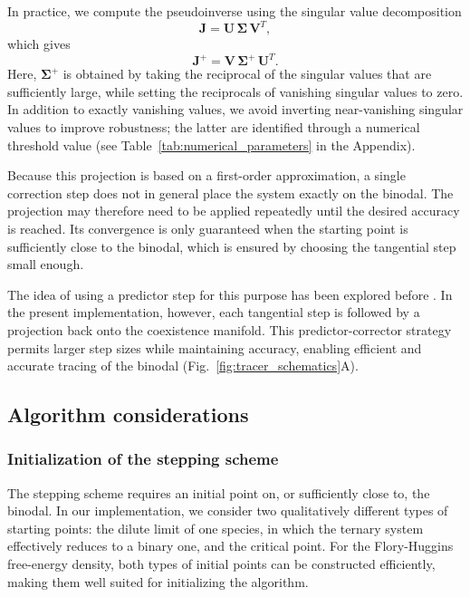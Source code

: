 \documentclass[12pt]{article}
\begin{document}
In practice, we compute the pseudoinverse using the singular value decomposition
\[
\boldsymbol{J} = \boldsymbol{U}\,\boldsymbol{\Sigma}\,\boldsymbol{V}^T,
\]
which gives
\[
\boldsymbol{J}^+ = \boldsymbol{V}\,\boldsymbol{\Sigma}^+\,\boldsymbol{U}^T.
\]
Here, \(\boldsymbol{\Sigma}^+\) is obtained by taking the reciprocal of the singular values that are sufficiently large, while setting the reciprocals of vanishing singular values to zero.
In addition to exactly vanishing values, we avoid inverting near-vanishing singular values to improve robustness; the latter are identified through a numerical threshold value (see Table~\ref{tab:numerical_parameters} in the Appendix).

Because this projection is based on a first-order approximation, a single correction step does not in general place the system exactly on the binodal.
The projection may therefore need to be applied repeatedly until the desired accuracy is reached.
Its convergence is only guaranteed when the starting point is sufficiently close to the binodal, which is ensured by choosing the tangential step small enough.

The idea of using a predictor step for this purpose has been explored before \cite{Shcherbakova2023}.
In the present implementation, however, each tangential step is followed by a projection back onto the coexistence manifold.
This predictor-corrector strategy permits larger step sizes while maintaining accuracy, enabling efficient and accurate tracing of the binodal (Fig.~\ref{fig:tracer_schematics}A).




\subsection{Algorithm considerations}
\subsubsection{Initialization of the stepping scheme}

The stepping scheme requires an initial point on, or sufficiently close to, the binodal.
In our implementation, we consider two qualitatively different types of starting points:
the dilute limit of one species, in which the ternary system effectively reduces to a binary one,
and the critical point.
For the Flory-Huggins free-energy density, both types of initial points can be constructed efficiently, making them well suited for initializing the algorithm.
\end{document}
